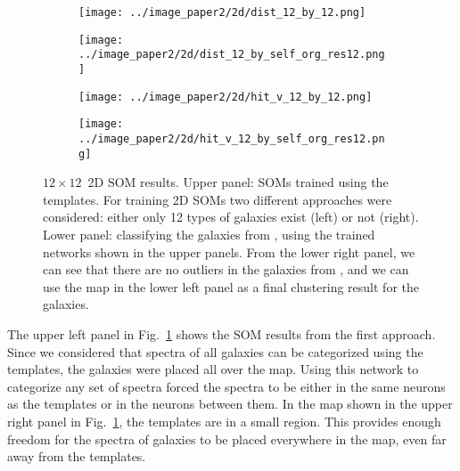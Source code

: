     \begin{figure}
        \begin{subfigure}[b]{0.45\textwidth}
            \centering
            \texttt{[image: ../image\_paper2/2d/dist\_12\_by\_12.png]}
        \end{subfigure}
        \hfill
        \begin{subfigure}[b]{0.45\textwidth}
            \centering
            \texttt{[image: ../image\_paper2/2d/dist\_12\_by\_self\_org\_res12.png]}
        \end{subfigure}
        \hfill
        \begin{subfigure}[b]{0.45\textwidth}
            \texttt{[image: ../image\_paper2/2d/hit\_v\_12\_by\_12.png]}
        \end{subfigure}
        \hfill
        \begin{subfigure}[b]{0.45\textwidth}
            \texttt{[image: ../image\_paper2/2d/hit\_v\_12\_by\_self\_org\_res12.png]}
        \end{subfigure}
        \caption[$12\times12$ two-dimensional self-organizing map results]{$12\times12$~2D SOM results. Upper panel: SOMs trained using the \citet{Kinney96} templates. For training 2D SOMs two different approaches were considered: either only 12 types of galaxies exist (left) or not (right). Lower panel: classifying the galaxies from , using the trained networks shown in the upper panels. From the lower right panel, we can see that there are no outliers in the galaxies from , and we can use the map in the lower left panel as a final clustering result for the  galaxies.}
        \label{fig: 12by12}
    \end{figure}
    
    The upper left panel in Fig.~\ref{fig: 12by12} shows the SOM results from the first approach. 
    Since we considered that spectra of all galaxies can be categorized using the  templates, the galaxies were placed all over the map.
    Using this network to categorize any set of spectra forced the spectra to be either in the same neurons as the  templates or in the neurons between them.
    In the map shown in the upper right panel in Fig.~\ref{fig: 12by12}, the  templates are in a small region. This provides enough freedom for the spectra of galaxies to be placed everywhere in the map, even far away from the templates.
    
